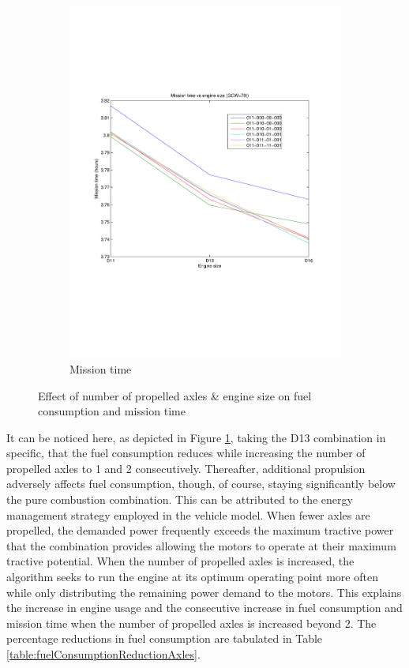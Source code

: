\documentclass{article}
\begin{document}
\begin{figure}[h!]
\begin{subfigure}{.5\textwidth}
	\includegraphics[width=\linewidth, clip=true, trim=45 185 65 210]{Figures/Increasing_number_of_axles/Mission_time_vs_axle_number_and_engine_size.pdf}
	\caption{Mission time}
\end{subfigure}
\caption{Effect of number of propelled axles \& engine size on fuel consumption and mission time}
\label{timeFuelNumberOfAxlesEngine}
\end{figure}

It can be noticed here, as depicted in Figure \ref{timeFuelNumberOfAxlesEngine}, taking the D13 combination in specific, that the fuel consumption reduces while increasing the number of propelled axles to 1 and 2 consecutively. Thereafter, additional propulsion adversely affects fuel consumption, though, of course, staying significantly below the pure combustion combination. This can be attributed to the energy management strategy employed in the vehicle model. When fewer axles are propelled, the demanded power frequently exceeds the maximum tractive power that the combination provides allowing the motors to operate at their maximum tractive potential. When the number of propelled axles is increased, the algorithm seeks to run the engine at its optimum operating point more often while only distributing the remaining power demand to the motors. This explains the increase in engine usage and the consecutive increase in fuel consumption and mission time when the number of propelled axles is increased beyond 2. The percentage reductions in fuel consumption are tabulated in Table \ref{table:fuelConsumptionReductionAxles}.\\
\end{document}
